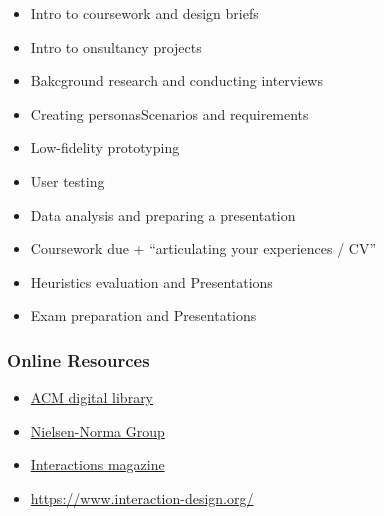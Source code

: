 \documentclass[a4paper]{article}
\begin{document}
\begin{itemize}
    \item Intro to coursework and design briefs
    \item Intro to onsultancy projects
    \item Bakcground research and conducting interviews
    \item Creating personasScenarios and requirements
    \item Low-fidelity prototyping
    \item User testing
    \item Data analysis and preparing a presentation
    \item Coursework due + ``articulating your experiences / CV''
    \item Heuristics evaluation and Presentations
    \item Exam preparation and Presentations
\end{itemize}

\subsubsection{Online Resources}
\begin{itemize}
    \item \href{https://dl.acm.org}{ACM digital library}
    \item \href{https://www.nngroup.com/articles/}{Nielsen-Norma Group}
    \item \href{https://interactions.acm.org}{Interactions magazine}
    \item \href{Interaction Design Foundation}{https://www.interaction-design.org/}
\end{itemize}


\end{document}
